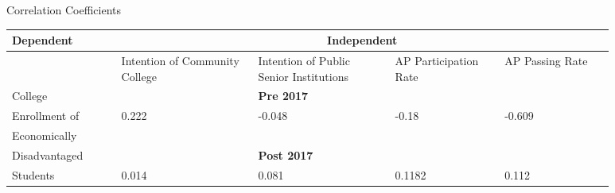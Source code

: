 \begin{threeparttable}
    \caption{Correlation Coefficients} %
\label{tab:correlationtable} %
    \begin{tabular}{>{\centering\arraybackslash} p{0.16\linewidth} p{0.2\linewidth} p{0.2\linewidth} p{0.16\linewidth} p{0.16\linewidth}}      
    \toprule %
    Dependent                        & \multicolumn{4}{c}{Independent} \\ %
                        \cmidrule(r){2-5} %
                            & Intention of Community College & Intention of Public Senior Institutions & AP Participation Rate & AP Passing Rate \\ %
                            
\midrule
College                     &        &  \textbf{Pre 2017}   &         &         \\     
Enrollment of               &  \large0.222& \large-0.048        &  \large-0.18  & \large-0.609  \\
Economically& && &\\      \cmidrule(r){2-5}
Disadvantaged               &        &  \textbf{Post 2017}  &         &  \\
Students                    & \large0.014  &\large0.081 & \large0.1182 & \large0.112  \\
\midrule
\end{tabular}

\end{threeparttable}